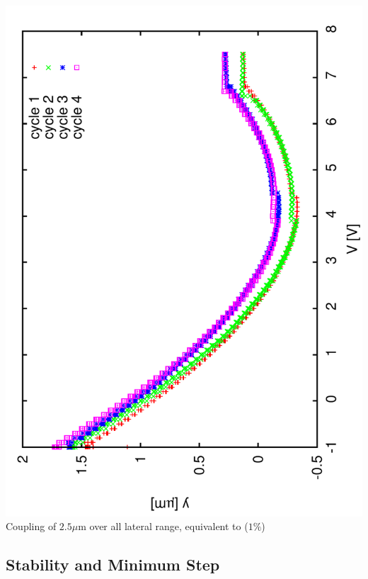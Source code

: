 \documentclass[a4paper,11pt]{book}
\begin{document}
\includegraphics[angle=-90,scale=0.10]{image62.pdf}\\
Coupling of $2.5\mu$m over all lateral range, equivalent to ($1\%$)\par

\subsection{Stability and Minimum Step}
\end{document}
